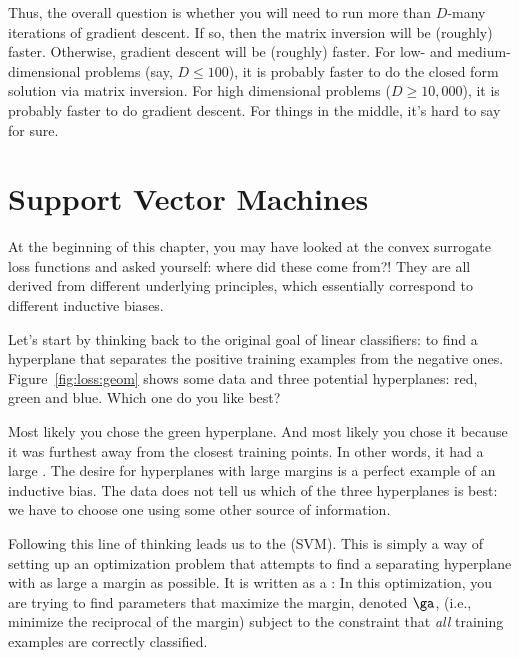 Thus, the overall question is whether you will need to run more than
$D$-many iterations of gradient descent.  If so, then the matrix
inversion will be (roughly) faster.  Otherwise, gradient descent will
be (roughly) faster.  For low- and medium-dimensional problems (say,
$D \leq 100$), it is probably faster to do the closed form solution
via matrix inversion.  For high dimensional problems ($D \geq
10,000$), it is probably faster to do gradient descent.  For things in
the middle, it's hard to say for sure.

\section{Support Vector Machines} \label{sec:loss:svm}

At the beginning of this chapter, you may have looked at the convex
surrogate loss functions and asked yourself: where did these come
from?!  They are all derived from different underlying principles,
which essentially correspond to different inductive biases.


Let's start by thinking back to the original goal of linear
classifiers: to find a hyperplane that separates the positive training
examples from the negative ones.  Figure~\ref{fig:loss:geom} shows
some data and three potential hyperplanes: red, green and blue.  Which
one do you like best?

Most likely you chose the green hyperplane.  And most likely you chose
it because it was furthest away from the closest training points.  In
other words, it had a large .  The desire for
hyperplanes with large margins is a perfect example of an inductive
bias.  The data does not tell us which of the three hyperplanes is
best: we have to choose one using some other source of information.

Following this line of thinking leads us to the  (SVM).  This is simply a way of setting up an
optimization problem that attempts to find a separating hyperplane
with as large a margin as possible.  It is written as a
:
%
%
In this optimization, you are trying to find parameters that maximize
the margin, denoted $\ga$, (i.e., minimize the reciprocal of the
margin) subject to the constraint that \emph{all} training examples
are correctly classified.

